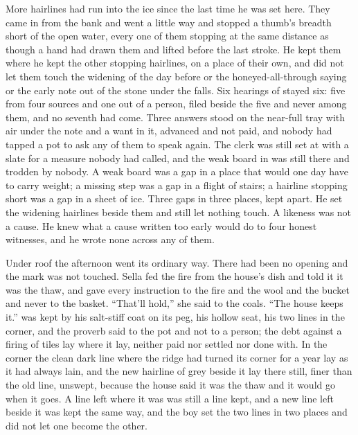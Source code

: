 More hairlines had run into the ice since the last time he was set here. They came in from the bank and went a little way and stopped a thumb's breadth short of the open water, every one of them stopping at the same distance as though a hand had drawn them and lifted before the last stroke. He kept them where he kept the other stopping hairlines, on a place of their own, and did not let them touch the widening of the day before or the honeyed-all-through saying or the early note out of the stone under the falls. Six hearings of  stayed six: five from four sources and one out of a person, filed beside the five and never among them, and no seventh had come. Three answers stood on the near-full tray with air under the note and a want in it, advanced and not paid, and nobody had tapped a pot to ask any of them to speak again. The clerk was still set at  with a slate for a measure nobody had called, and the weak board in  was still there and trodden by nobody. A weak board was a gap in a place that would one day have to carry weight; a missing step was a gap in a flight of stairs; a hairline stopping short was a gap in a sheet of ice. Three gaps in three places, kept apart. He set the widening hairlines beside them and still let nothing touch. A likeness was not a cause. He knew what a cause written too early would do to four honest witnesses, and he wrote none across any of them.

Under  roof the afternoon went its ordinary way. There had been no opening and the mark was not touched. Sella fed the fire from the house's dish and told it it was the thaw, and gave every instruction to the fire and the wool and the bucket and never to the basket. “That'll hold,” she said to the coals. “The house keeps it.”  was kept by his salt-stiff coat on its peg, his hollow seat, his two lines in the corner, and the proverb said to the pot and not to a person; the debt against a firing of tiles lay where it lay, neither paid nor settled nor done with. In the corner the clean dark line where the  ridge had turned its corner for a year lay as it had always lain, and the new hairline of grey beside it lay there still, finer than the old line, unswept, because the house said it was the thaw and it would go when it goes. A line left where it was was still a line kept, and a new line left beside it was kept the same way, and the boy set the two lines in two places and did not let one become the other.

